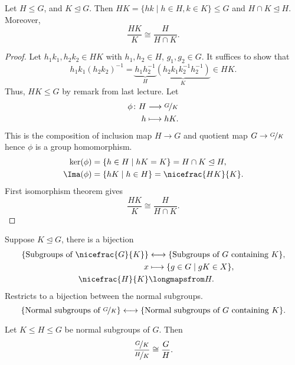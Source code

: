 \begin{theorem}
    Let \(H \leq G\), and \(K \trianglelefteq G\). Then \(HK = \{hk \mid h \in H, k\in K\} \leq G\) and \(H \cap K \trianglelefteq H\). Moreover,
    \[
        \frac{HK}{K} \cong \frac{H}{H\cap K}.
    \]
\end{theorem}
\begin{proof}
    Let \(h_1 k_1, h_2 k_2 \in HK\) with \(h_1, h_2 \in H\), \(g_1, g_2 \in G\). It suffices to show that
    \begin{equation*}
        h_1 k_1 (h_2 k_2)^{-1} = \underbrace{h_1 h_2^{-1}}_H \underbrace{(h_2 k_1 k_2^{-1} h_2^{-1})}_K\in HK.
    \end{equation*}
    Thus, \(HK \leq G\) by remark from last lecture. Let
    \begin{equation*}
    \begin{aligned}
      \phi\colon H & \longrightarrow \nicefrac{G}{K}      \\
      h    & \longmapsto hK.
    \end{aligned}
    \end{equation*}
    This is the composition of inclusion map \(H \to G\) and quotient map \(G \to \nicefrac{G}{K}\) hence \(\phi\) is a group homomorphism.
    \begin{align*}
        \ker(\phi) &= \{h\in H\mid hK = K\} = H \cap K \trianglelefteq H,\\
        \Ima(\phi) &= \{hK\mid h\in H\} = \nicefrac{HK}{K}.
    \end{align*}
    First isomorphism theorem gives
    \[
        \frac{HK}{K} \cong \frac{H}{H\cap K}.
    \]
\end{proof}
\begin{remark}
    Suppose \(K \trianglelefteq G\), there is a bijection
    \begin{align*}
        \{\text{Subgroups of }\nicefrac{G}{K}\} &\longleftrightarrow\{\text{Subgroups of }G\text{ containing }K\},\\
        x &\longmapsto \{g\in G\mid gK \in X\},\\
        \nicefrac{H}{K}&\longmapsfrom H.
    \end{align*}
    Restricts to a bijection between the normal subgroups.
    \[
        \{\text{Normal subgroups of }\nicefrac{G}{K}\} \longleftrightarrow\{\text{Normal subgroups of }G\text{ containing }K\}.
    \]
\end{remark}
\begin{theorem}
    Let \(K \leq  H \leq  G\) be normal subgroups of \(G\). Then
    \[
        \frac{\nicefrac{G}{K}}{\nicefrac{H}{K}}\cong \frac{G}{H}.
    \]
\end{theorem}
